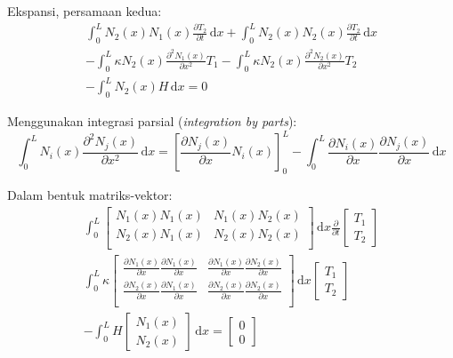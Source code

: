 Ekspansi, persamaan kedua:
\begin{align*}
\int_{0}^{L} N_{2}(x) N_{1}(x) \frac{\partial T_2}{\partial t}\, \mathrm{d}x
+ \int_{0}^{L} N_{2}(x) N_{2}(x) \frac{\partial T_2}{\partial t}\, \mathrm{d}x \\
- \int_{0}^{L} \kappa N_{2}(x) \frac{\partial^2 N_{1}(x)}{\partial x^2} T_{1}
- \int_{0}^{L} \kappa N_{2}(x) \frac{\partial^2 N_{2}(x)}{\partial x^2} T_{2} \\
- \int_{0}^{L} N_{2}(x) H \, \mathrm{d}x = 0
\end{align*}

Menggunakan integrasi parsial (\textit{integration by parts}):
\begin{equation*}
\int_{0}^{L} N_{i}(x) \frac{\partial^2 N_{j}(x)}{\partial x^2} \, \mathrm{d}x =
\left[ \frac{\partial N_{j}(x)}{\partial x} N_{i}(x) \right]_{0}^{L} -
\int_{0}^{L} \frac{\partial N_{i}(x)}{\partial x}
\frac{\partial N_{j}(x)}{\partial x} \, \mathrm{d}x
\end{equation*}

Dalam bentuk matriks-vektor:
\begin{align*}
\int_{0}^{L}
\begin{bmatrix}
N_{1}(x) N_{1}(x) & N_{1}(x) N_{2}(x) \\
N_{2}(x) N_{1}(x) & N_{2}(x) N_{2}(x) \\
\end{bmatrix}\, \mathrm{d}x
\frac{\partial}{\partial t}
\begin{bmatrix} T_{1} \\ T_{2} \end{bmatrix} \\
\int_{0}^{L} \kappa
\begin{bmatrix}
\frac{\partial N_{1}(x)}{\partial x} \frac{\partial N_{1}(x)}{\partial x} &
\frac{\partial N_{1}(x)}{\partial x} \frac{\partial N_{2}(x)}{\partial x} \\
\frac{\partial N_{2}(x)}{\partial x} \frac{\partial N_{1}(x)}{\partial x} &
\frac{\partial N_{2}(x)}{\partial x} \frac{\partial N_{2}(x)}{\partial x} \\
\end{bmatrix} \, \mathrm{d}x
\begin{bmatrix} T_{1} \\ T_{2} \end{bmatrix} \\
- \int_{0}^{L} H \begin{bmatrix} N_{1}(x) \\ N_{2}(x) \end{bmatrix}\, \mathrm{d}x = 
\begin{bmatrix} 0 \\ 0 \end{bmatrix}
\end{align*}

